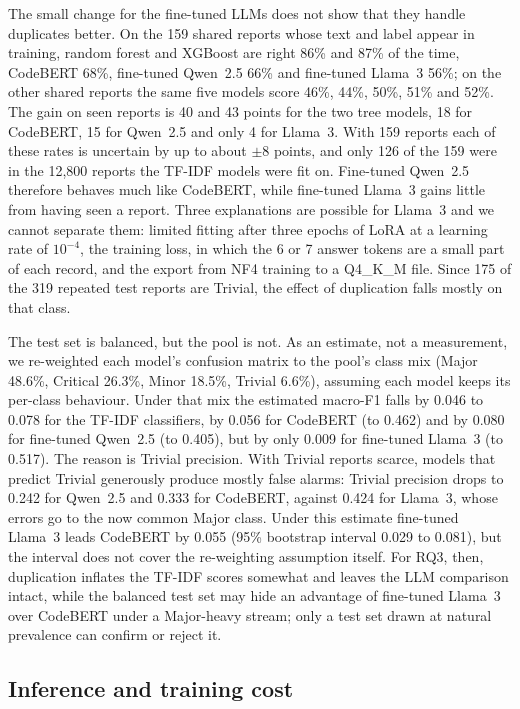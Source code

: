 \documentclass[a4paper,fleqn]{cas-sc}
\begin{document}
The small change for the fine-tuned LLMs does not show that they handle duplicates
better. On the 159 shared reports whose text and label appear in training, random
forest and XGBoost are right 86\% and 87\% of the time, CodeBERT 68\%, fine-tuned
Qwen~2.5 66\% and fine-tuned Llama~3 56\%; on the other shared reports the same five
models score 46\%, 44\%, 50\%, 51\% and 52\%. The gain on seen reports is 40 and 43
points for the two tree models, 18 for CodeBERT, 15 for Qwen~2.5 and only 4 for
Llama~3. With 159 reports each of these rates is uncertain by up to about $\pm$8 points, and
only 126 of the 159 were in the 12,800 reports the TF-IDF models were fit on. Fine-tuned
Qwen~2.5 therefore behaves much like CodeBERT, while fine-tuned Llama~3 gains little
from having seen a report. Three explanations are possible for Llama~3 and we cannot
separate them: limited fitting after three epochs of LoRA at a learning rate of
$10^{-4}$, the training loss, in which the 6 or 7 answer tokens are a small part of each
record, and the export from NF4 training to a Q4\_K\_M file. Since 175 of the 319
repeated test reports are Trivial, the effect of duplication falls mostly on that
class.

The test set is balanced, but the pool is not. As an estimate, not a measurement, we
re-weighted each model's confusion matrix to the pool's class mix (Major 48.6\%,
Critical 26.3\%, Minor 18.5\%, Trivial 6.6\%), assuming each model keeps its per-class
behaviour. Under that mix the estimated macro-F1 falls by 0.046 to 0.078 for the TF-IDF
classifiers, by 0.056 for CodeBERT (to 0.462) and by 0.080 for fine-tuned Qwen~2.5 (to
0.405), but by only 0.009 for fine-tuned Llama~3 (to 0.517). The reason is Trivial
precision. With Trivial reports scarce, models that predict Trivial generously produce
mostly false alarms: Trivial precision drops to 0.242 for Qwen~2.5 and 0.333 for
CodeBERT, against 0.424 for Llama~3, whose errors go to the now common Major class.
Under this estimate fine-tuned Llama~3 leads CodeBERT by 0.055 (95\% bootstrap interval
0.029 to 0.081), but the interval does not cover the re-weighting assumption itself.
For RQ3, then, duplication inflates the TF-IDF scores somewhat and leaves the LLM
comparison intact, while the balanced test set may hide an advantage of fine-tuned
Llama~3 over CodeBERT under a Major-heavy stream; only a test set drawn at natural
prevalence can confirm or reject it.

\subsection{Inference and training cost}
\label{sec:res_cost}
\end{document}
